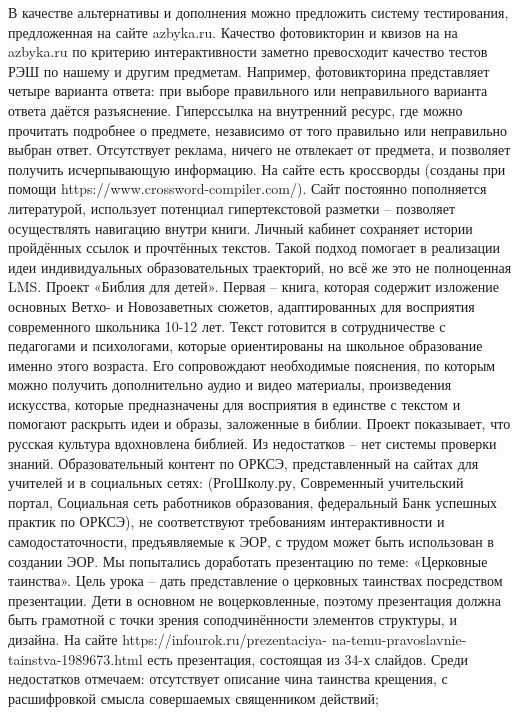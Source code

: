 В качестве альтернативы и дополнения можно предложить систему тестирования, предложенная на сайте azbyka.ru. Качество фотовикторин и квизов на на azbyka.ru по критерию интерактивности заметно превосходит качество тестов РЭШ по нашему и другим предметам. Например, фотовикторина представляет четыре варианта ответа: при выборе правильного или неправильного варианта ответа даётся разъяснение. Гиперссылка на внутренний ресурс, где можно прочитать подробнее о предмете, независимо от того правильно или неправильно выбран ответ. Отсутствует реклама, ничего не отвлекает от предмета, и позволяет получить исчерпывающую информацию. На сайте есть кроссворды (созданы при помощи https://www.crossword-compiler.com/). Сайт постоянно пополняется литературой, использует потенциал гипертекстовой разметки – позволяет осуществлять навигацию внутри книги. Личный кабинет сохраняет истории пройдённых ссылок и прочтённых текстов. Такой подход помогает в реализации идеи индивидуальных образовательных траекторий, но всё же это не полноценная LMS.
Проект «Библия для детей»\cite{biblechild}. Первая – книга, которая содержит изложение основных Ветхо- и Новозаветных сюжетов, адаптированных для восприятия современного школьника 10-12 лет. Текст готовится в сотрудничестве с педагогами и психологами, которые ориентированы на школьное образование именно этого возраста. Его сопровождают необходимые пояснения, по которым можно получить дополнительно аудио и видео материалы, произведения искусства, которые предназначены для восприятия в единстве с текстом и помогают раскрыть идеи и образы, заложенные в библии. Проект показывает, что русская культура вдохновлена библией. Из недостатков – нет системы проверки знаний.
Образовательный контент по ОРКСЭ, представленный на сайтах для учителей и в социальных сетях: (РгоШколу.ру, Современный учительский портал, Социальная сеть работников образования, федеральный Банк успешных практик по ОРКСЭ), не соответствуют требованиям интерактивности и самодостаточности, предъявляемые к ЭОР, с трудом может быть использован в создании ЭОР. 
Мы попытались доработать презентацию по теме: «Церковные таинства». Цель урока – дать представление о церковных таинствах посредством презентации. Дети в основном не воцерковленные, поэтому презентация должна быть грамотной с точки зрения соподчинённости элементов структуры, и дизайна. На сайте https://infourok.ru/prezentaciya- na-temu-pravoslavnie-tainstva-1989673.html есть презентация, состоящая из 34-х слайдов. Среди недостатков отмечаем:
отсутствует описание чина таинства крещения, с расшифровкой смысла совершаемых священником действий;
